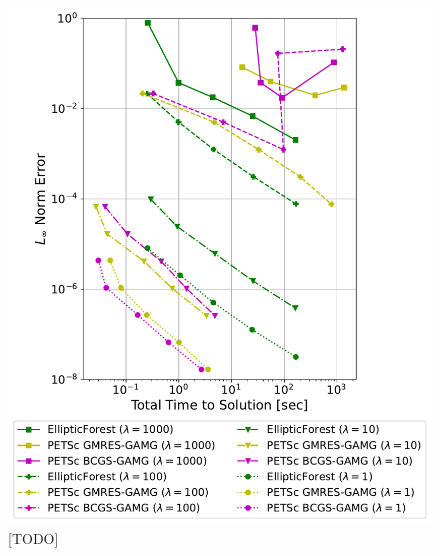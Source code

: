 \begin{figure}
    \centering
    \includegraphics[width=1.0\textwidth, clip=true, trim={0 0 0 0}]{figures/case03-work-precision-plots-no-title.pdf}
    \caption{[TODO]}
    \label{fig:case03-work-precision-plot}
\end{figure}
